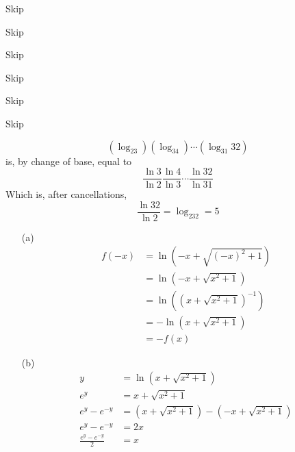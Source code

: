 \documentclass{article}
\begin{document}
\begin{Answer}
    Skip
\end{Answer}

\begin{Answer}
    Skip
\end{Answer}

\begin{Answer}
    Skip
\end{Answer}

\begin{Answer}
    Skip
\end{Answer}

\begin{Answer}
    Skip
\end{Answer}

\begin{Answer}
    Skip
\end{Answer}

\begin{Answer}
    \[(\log_23)(\log_34)\cdots(\log_{31}32)\]
    is, by change of base, equal to
    \[\frac{\ln3}{\ln2}\frac{\ln4}{\ln3}\cdots\frac{\ln32}{\ln31}\]
    Which is, after cancellations,
    \[\frac{\ln32}{\ln2} = \log_232 = 5\]
\end{Answer}

\begin{Answer}
    \begin{itemize}
        \item[(a)]
            \begin{align*}
                f(-x) &= \ln(-x + \sqrt{(-x)^2 + 1}) \\
                      &= \ln(-x + \sqrt{x^2 + 1}) \\
                      &= \ln((x + \sqrt{x^2 + 1})^{-1}) \\
                      &= -\ln(x + \sqrt{x^2 + 1}) \\
                      &= -f(x)
            \end{align*}
        \item[(b)]
            \begin{align*}
                y &= \ln(x + \sqrt{x^2+1}) \\
                e^y &= x + \sqrt{x^2+1} \\
                e^y - e^{-y} &= (x + \sqrt{x^2+1}) - (-x + \sqrt{x^2+1}) \\
                e^y - e^{-y} &= 2x \\
                \frac{e^y - e^{-y}}{2} &= x \\
            \end{align*}
    \end{itemize}
\end{Answer}
\end{document}
